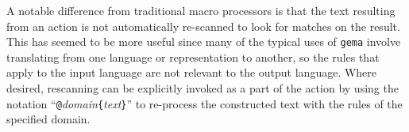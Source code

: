 A notable difference from traditional macro processors is that the text
resulting
from an action is not automatically re-scanned to look for matches on the
result.  This has seemed to be more useful since many of the typical
uses of {\tt gema} involve translating from one language or representation
to another, so the rules that apply to the input language are not relevant to
the output language.  Where desired, rescanning can be explicitly invoked
as a part of the action by using the notation
``\verb/@/{\em domain}\verb/{/{\em text}\verb/}/'' to re-process the
constructed text with the rules of the specified domain.

